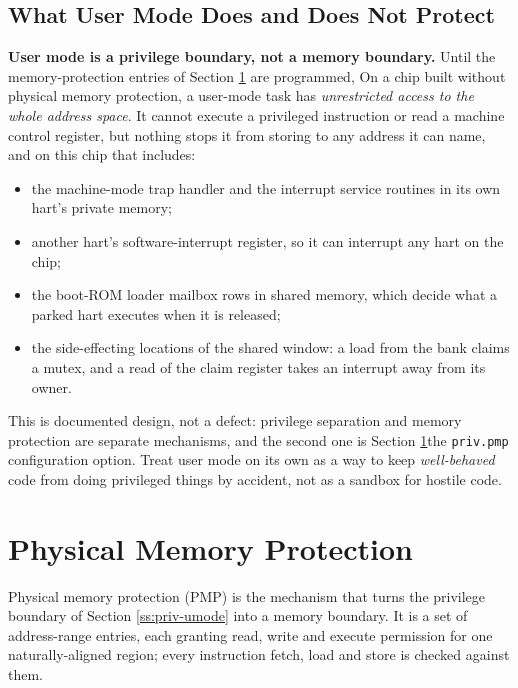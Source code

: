 \subsection{What User Mode Does and Does Not Protect} \label{sss:priv-umode-safety}

\textbf{User mode is a privilege boundary, not a memory boundary.} \ifprivpmp Until the memory-protection entries of Section \ref{ss:priv-pmp} are programmed, \else On a chip built without physical memory protection, \fi a user-mode task has \textit{unrestricted access to the whole address space}. It cannot execute a privileged instruction or read a machine control register, but nothing stops it from storing to any address it can name, and on this chip that includes:

\begin{itemize}
	\item the machine-mode trap handler and the interrupt service routines in its own hart's private memory;
	\item another hart's  software-interrupt register, so it can interrupt any hart on the chip;
	\item the boot-ROM loader mailbox rows in shared memory, which decide what a parked hart executes when it is released;
	\item the side-effecting locations of the shared window: a load from the  bank claims a mutex, and a read of the  claim register takes an interrupt away from its owner.
\end{itemize}

This is documented design, not a defect: privilege separation and memory protection are separate mechanisms, and the second one is \ifprivpmp Section \ref{ss:priv-pmp}\else the \texttt{priv.pmp} configuration option\fi. Treat user mode on its own as a way to keep \textit{well-behaved} code from doing privileged things by accident, not as a sandbox for hostile code.

\fi

\ifprivpmp

\section{Physical Memory Protection} \label{ss:priv-pmp}

Physical memory protection (PMP) is the mechanism that turns the privilege boundary of Section \ref{ss:priv-umode} into a memory boundary. It is a set of \PmpEntries{} address-range entries, each granting read, write and execute permission for one naturally-aligned region; every instruction fetch, load and store is checked against them.

